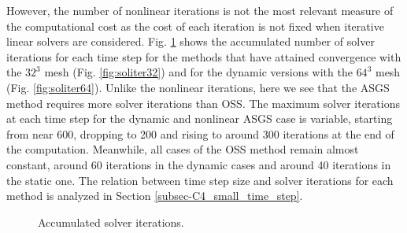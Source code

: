 However, the number of nonlinear iterations is not the most relevant measure of the computational cost as the cost of each iteration is not fixed when iterative linear solvers are considered. Fig. \ref{fig:com_cost_DHIT} shows the accumulated number of solver iterations for each time step for the methods that have attained convergence with the $32^3$ mesh (Fig. \ref{fig:soliter32}) and for the dynamic versions with the $64^3$ mesh (Fig. \ref{fig:soliter64}). 
Unlike the nonlinear iterations, here we see that the ASGS method requires more solver iterations than OSS. The maximum solver iterations at each time step for the dynamic and nonlinear ASGS case is variable, starting from near 600, dropping to 200 and rising to around 300 iterations at the end of the computation. Meanwhile, all cases of the OSS method remain almost constant, around 60 iterations in the dynamic cases and around 40 iterations in the static one. The relation between time step size and solver iterations for each method is analyzed in Section \ref{subsec-C4_small_time_step}. %

\begin{figure}[h!]
	\centering	
	\caption{Accumulated solver iterations.}
	\label{fig:com_cost_DHIT}
\end{figure}

